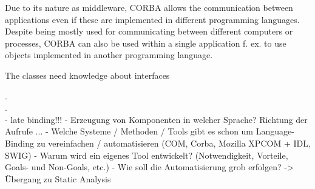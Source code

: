 Due to its nature as middleware, CORBA allows the communication between applications even if these are implemented in different programming languages. Despite being mostly used for communicating between different computers or processes, CORBA can also be used within a single application f. ex. to use objects implemented in another programming language.

The classes need knowledge about interfaces

.\\
.\\
  - late binding!!!
  - Erzeugung von Komponenten in welcher Sprache? Richtung der Aufrufe ...
  - Welche Systeme / Methoden / Tools gibt es schon um Language-Binding zu vereinfachen / automatisieren (COM, Corba, Mozilla XPCOM + IDL, SWIG)
  - Warum wird ein eigenes Tool entwickelt? (Notwendigkeit, Vorteile, Goals- und Non-Goals, etc.)
  - Wie soll die Automatisierung grob erfolgen? -> Übergang zu Static Analysis